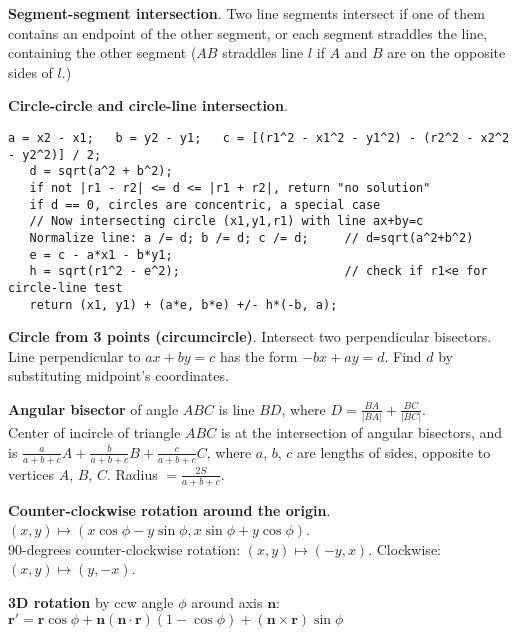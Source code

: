 \documentclass[a4paper, 12pt]{article}
\newcommand{\Topic}[1]{\textbf{#1}}
\begin{document}
\Topic{Segment-segment intersection}.
Two line segments intersect if one of them contains an endpoint of the other segment,
or each segment straddles the line, containing the other segment
($AB$ straddles line $l$ if $A$ and $B$ are on the opposite sides of $l$.)

\Topic{Circle-circle and circle-line intersection}.
\vspace{-5mm}
\begin{Verbatim}[fontsize=\small, tabsize=4]
   a = x2 - x1;   b = y2 - y1;   c = [(r1^2 - x1^2 - y1^2) - (r2^2 - x2^2 - y2^2)] / 2;
   d = sqrt(a^2 + b^2);
   if not |r1 - r2| <= d <= |r1 + r2|, return "no solution"
   if d == 0, circles are concentric, a special case
   // Now intersecting circle (x1,y1,r1) with line ax+by=c
   Normalize line: a /= d; b /= d; c /= d;     // d=sqrt(a^2+b^2)
   e = c - a*x1 - b*y1;
   h = sqrt(r1^2 - e^2);                       // check if r1<e for circle-line test
   return (x1, y1) + (a*e, b*e) +/- h*(-b, a);
\end{Verbatim}
\vspace{-3mm}

\Topic{Circle from 3 points (circumcircle)}.  Intersect two perpendicular bisectors.
Line perpendicular to $ax+by=c$ has the form $-bx+ay=d$.
Find $d$ by substituting midpoint's coordinates.

\Topic{Angular bisector} of angle $ABC$ is line $BD$, where $D = \frac{BA}{|BA|} + \frac{BC}{|BC|}$. \\
Center of incircle of triangle $ABC$ is at the intersection of angular
bisectors, and is $\frac{a}{a+b+c} A + \frac{b}{a+b+c} B + \frac{c}{a+b+c} C$,
where $a$, $b$, $c$ are lengths of sides, opposite to vertices $A$, $B$, $C$.
Radius $= \frac{2S}{a+b+c}$.

%
%

\Topic{Counter-clockwise rotation around the origin}.
$(x, y) \mapsto (x \cos \phi - y \sin \phi, x \sin \phi + y \cos \phi)$. \\
90-degrees counter-clockwise rotation: $(x, y) \mapsto (-y, x)$.
Clockwise: $(x, y) \mapsto (y, -x)$.

\Topic{3D rotation} by ccw angle $\phi$ around axis $\mathbf{n}$:
$\mathbf{r}' =
   \mathbf{r} \cos\phi +
   \mathbf{n} (\mathbf{n} \cdot \mathbf{r}) (1 - \cos\phi) +
   (\mathbf{n} \times \mathbf{r}) \sin\phi$
\end{document}
